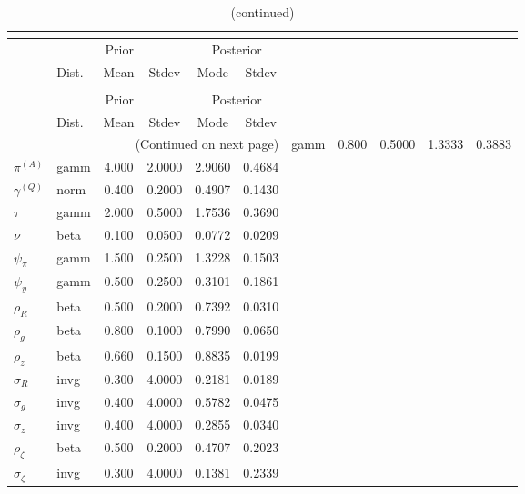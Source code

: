  
\begin{center}
\begin{longtable}{llcccc} 
\caption{Results from posterior maximization (parameters)}\\
 \label{Table:Posterior:1}\\
\toprule 
  & \multicolumn{3}{c}{Prior}  &  \multicolumn{2}{c}{Posterior} \\
  \cmidrule(r{.75em}){2-4} \cmidrule(r{.75em}){5-6}
  & Dist. & Mean  & Stdev & Mode & Stdev \\ 
\midrule \endfirsthead 
\caption{(continued)}\\
 \bottomrule 
  & \multicolumn{3}{c}{Prior}  &  \multicolumn{2}{c}{Posterior} \\
  \cmidrule(r{.75em}){2-4} \cmidrule(r{.75em}){5-6}
  & Dist. & Mean  & Stdev & Mode & Stdev \\ 
\midrule \endhead 
\bottomrule \multicolumn{6}{r}{(Continued on next page)}\endfoot 
\bottomrule\endlastfoot 
${r_{A}}$ & gamm &   0.800 & 0.5000 &   1.3333 &  0.3883 \\ 
${\pi^{(A)}}$ & gamm &   4.000 & 2.0000 &   2.9060 &  0.4684 \\ 
${\gamma^{(Q)}}$ & norm &   0.400 & 0.2000 &   0.4907 &  0.1430 \\ 
${\tau}$ & gamm &   2.000 & 0.5000 &   1.7536 &  0.3690 \\ 
${\nu}$ & beta &   0.100 & 0.0500 &   0.0772 &  0.0209 \\ 
${\psi_\pi}$ & gamm &   1.500 & 0.2500 &   1.3228 &  0.1503 \\ 
${\psi_y}$ & gamm &   0.500 & 0.2500 &   0.3101 &  0.1861 \\ 
${\rho_R}$ & beta &   0.500 & 0.2000 &   0.7392 &  0.0310 \\ 
${\rho_{g}}$ & beta &   0.800 & 0.1000 &   0.7990 &  0.0650 \\ 
${\rho_z}$ & beta &   0.660 & 0.1500 &   0.8835 &  0.0199 \\ 
${\sigma_R}$ & invg &   0.300 & 4.0000 &   0.2181 &  0.0189 \\ 
${\sigma_{g}}$ & invg &   0.400 & 4.0000 &   0.5782 &  0.0475 \\ 
${\sigma_z}$ & invg &   0.400 & 4.0000 &   0.2855 &  0.0340 \\ 
${\rho_\zeta}$ & beta &   0.500 & 0.2000 &   0.4707 &  0.2023 \\ 
${\sigma_\zeta}$ & invg &   0.300 & 4.0000 &   0.1381 &  0.2339 \\ 
\end{longtable}
 \end{center}

